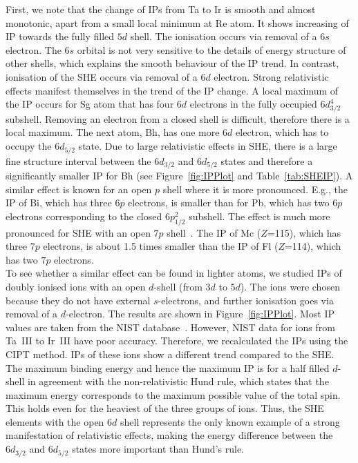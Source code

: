 \documentclass[10pt,a4paper, twoside, openright]{report}
\begin{document}
First, we note that the change of IPs from Ta to Ir is smooth and almost monotonic, apart from a small local minimum at Re atom. It shows increasing of IP towards the fully filled $5d$ shell. The ionisation occurs via removal of a $6s$ electron. The $6s$ orbital is not very sensitive to the details of energy structure of other shells, which explains the smooth behaviour of the IP trend. In contrast, ionisation of the SHE occurs via removal of a $6d$ electron. Strong relativistic effects manifest themselves in the trend of the IP change. A local maximum of the IP occurs for Sg atom that has four $6d$ electrons in the fully occupied $6d_{3/2}^4$ subshell. Removing an electron from a closed shell is difficult, therefore there is a local maximum. The next atom, Bh, has one more $6d$ electron, which has to occupy the $6d_{5/2}$ state. Due to large relativistic effects in SHE, there is a large fine structure interval between the  $6d_{3/2}$ and $6d_{5/2}$ states and therefore a significantly smaller IP for Bh (see Figure~\ref{fig:IPPlot} and Table~\ref{tab:SHEIP}). A similar effect is known for an open $p$ shell where it is more pronounced. E.g., the IP of Bi, which has three $6p$ electrons, is smaller than for Pb, which has two $6p$ electrons corresponding to the closed $6p_{1/2}^2$ subshell. The effect is much more pronounced for SHE with an open $7p$ shell~\cite{DF2016}. The IP of Mc ($Z$=115), which has three $7p$ electrons, is about 1.5 times smaller than the IP of Fl ($Z$=114), which has two $7p$ electrons. \\
\linebreak
To see whether a similar effect can be found in lighter atoms, we studied IPs of doubly ionised ions with an open $d$-shell (from $3d$ to $5d$). The ions were chosen because they do not have external $s$-electrons, and further ionisation goes via removal of a $d$-electron. The results are shown in Figure~\ref{fig:IPPlot}. Most IP values are taken from the NIST database~\cite{NIST_ASD}. However, NIST data for ions from Ta~III to Ir~III have poor accuracy. Therefore, we recalculated the IPs using the CIPT method. IPs of these ions show a different trend compared to the SHE. The maximum binding energy and hence the maximum IP is for a half filled $d$-shell in agreement with the non-relativistic Hund rule, which states that the maximum energy corresponds to the maximum possible value of the total spin.  This holds even for the heaviest of the three groups of ions. Thus, the SHE elements with the open $6d$ shell represents the only known example of a strong manifestation of relativistic effects, making  the energy difference between the $6d_{3/2}$ and $6d_{5/2}$ states more important than Hund's rule. \\
\end{document}
